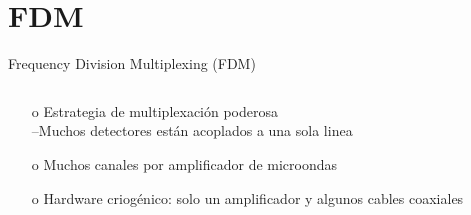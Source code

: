 \documentclass[ignorenonframetext,12pt]{beamer}
\begin{document}
\section{FDM}
\begin{frame}{Frequency Division Multiplexing (FDM)}
				\begin{columns}
								\begin{column}{0.5\textwidth}
												\begin{itemize}
																\item[o]	Estrategia de multiplexación poderosa\\
												\qquad --\footnotesize{Muchos detectores están acoplados
												a una sola linea}
								\item[o] Muchos canales por amplificador de microondas
								\item[o] Hardware criogénico: solo un amplificador y algunos
												cables coaxiales
												\end{itemize}


\end{column}
\end{columns}
\end{frame}
\end{document}
